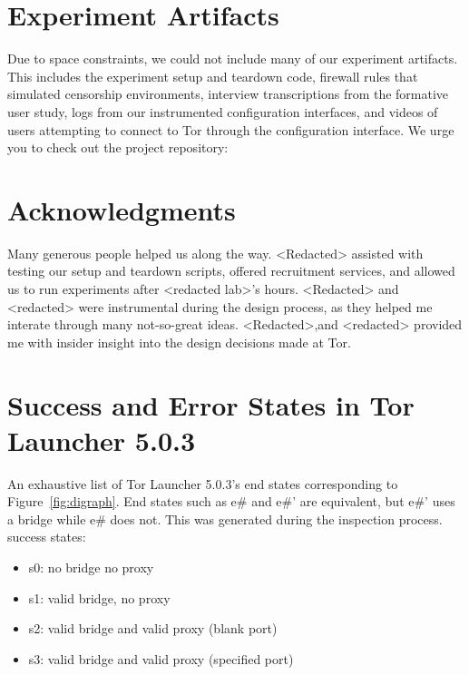 \documentclass[USenglish,oneside,twocolumn]{article}
\begin{document}
\section {Experiment Artifacts} 
Due to space constraints, we could not include many of our experiment artifacts. This includes the experiment setup and teardown code, firewall rules that simulated censorship environments, interview transcriptions from the formative user study, logs from our instrumented configuration interfaces, and videos of users attempting to connect to Tor through the configuration interface. We urge you to check out the project repository: \\


\section {Acknowledgments}
Many generous people helped us along the way. <Redacted> assisted with testing our setup and teardown scripts, offered recruitment services, and allowed us to run experiments after <redacted lab>'s hours. <Redacted> and <redacted> were instrumental during the design process, as they helped me interate through many not-so-great ideas.  <Redacted>,and <redacted> provided me with insider insight into the design decisions made at Tor.




\appendix

\section{Success and Error States in Tor Launcher 5.0.3} 
\label{states} 
An exhaustive list of Tor Launcher 5.0.3's end states corresponding to Figure~\ref{fig:digraph}. End states such as e\# and e\#' are equivalent, but e\#' uses a bridge while e\# does not. This was generated during the inspection process.\\

\noindent success states: 
\begin{itemize}
\item s0: no bridge no proxy
\item s1: valid bridge, no proxy
\item s2: valid bridge and valid proxy (blank port)
\item s3: valid bridge and valid proxy (specified port)
\end{itemize}
\end{document}
